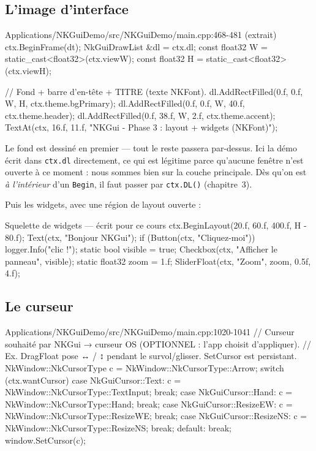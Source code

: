 \subsection{L'image d'interface}

\begin{nkcode}{Applications/NKGuiDemo/src/NKGuiDemo/main.cpp:468-481 (extrait)}
        ctx.BeginFrame(dt);
        NkGuiDrawList &dl = ctx.dl;
        const float32 W = static_cast<float32>(ctx.viewW);
        const float32 H = static_cast<float32>(ctx.viewH);

        // Fond + barre d'en-tête + TITRE (texte NKFont).
        dl.AddRectFilled({0.f, 0.f, W, H}, ctx.theme.bgPrimary);
        dl.AddRectFilled({0.f, 0.f, W, 40.f}, ctx.theme.header);
        dl.AddRectFilled({0.f, 38.f, W, 2.f}, ctx.theme.accent);
        TextAt(ctx, {16.f, 11.f}, "NKGui - Phase 3 : layout + widgets (NKFont)");
\end{nkcode}

Le fond est dessiné en premier — tout le reste passera par-dessus. Ici la démo
écrit dans \texttt{ctx.dl} directement, ce qui est légitime parce qu'aucune
fenêtre n'est ouverte à ce moment : nous sommes bien sur la couche principale.
Dès qu'on est \emph{à l'intérieur} d'un \texttt{Begin}, il faut passer par
\texttt{ctx.DL()} (chapitre~3).

Puis les widgets, avec une région de layout ouverte :

\begin{nkcode}{Squelette de widgets — écrit pour ce cours}
        ctx.BeginLayout({20.f, 60.f, 400.f, H - 80.f});
        Text(ctx, "Bonjour NKGui");
        if (Button(ctx, "Cliquez-moi")) {
            logger.Info("clic !");
        }
        static bool visible = true;
        Checkbox(ctx, "Afficher le panneau", visible);
        static float32 zoom = 1.f;
        SliderFloat(ctx, "Zoom", zoom, 0.5f, 4.f);
\end{nkcode}

\subsection{Le curseur}

\begin{nkcode}{Applications/NKGuiDemo/src/NKGuiDemo/main.cpp:1020-1041}
        // Curseur souhaité par NKGui → curseur OS (OPTIONNEL : l'app choisit d'appliquer).
        // Ex. DragFloat pose ↔ / ↕ pendant le survol/glisser. SetCursor est persistant.
        {
            NkWindow::NkCursorType c = NkWindow::NkCursorType::Arrow;
            switch (ctx.wantCursor) {
                case NkGuiCursor::Text:
                    c = NkWindow::NkCursorType::TextInput;
                    break;
                case NkGuiCursor::Hand:
                    c = NkWindow::NkCursorType::Hand;
                    break;
                case NkGuiCursor::ResizeEW:
                    c = NkWindow::NkCursorType::ResizeWE;
                    break;
                case NkGuiCursor::ResizeNS:
                    c = NkWindow::NkCursorType::ResizeNS;
                    break;
                default:
                    break;
            }
            window.SetCursor(c);
        }
\end{nkcode}

